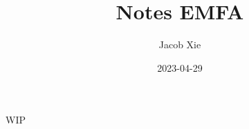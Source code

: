 \documentclass[UTF8]{ctexart}
\title{Notes EMFA}
\author{Jacob Xie}
\date{2023-04-29}
\numberwithin{equation}{section}
\begin{document}
\maketitle
\newpage

WIP
\end{document}
